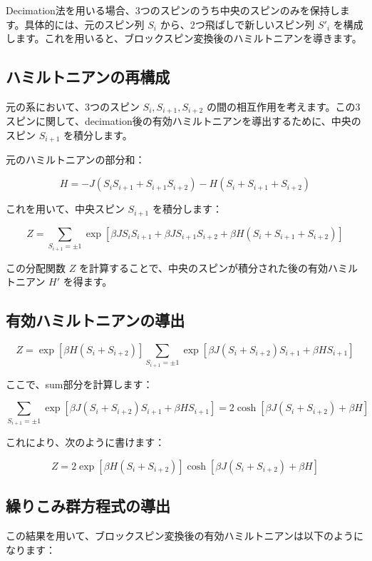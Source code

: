 \documentclass[a4paper,10pt]{ltjsarticle} %
\begin{document}
Decimation法を用いる場合、3つのスピンのうち中央のスピンのみを保持します。具体的には、元のスピン列 \( S_i \) から、2つ飛ばしで新しいスピン列 \( S'_i \) を構成します。これを用いると、ブロックスピン変換後のハミルトニアンを導きます。

\subsection*{ハミルトニアンの再構成}

元の系において、3つのスピン \( S_i, S_{i+1}, S_{i+2} \) の間の相互作用を考えます。この3スピンに関して、decimation後の有効ハミルトニアンを導出するために、中央のスピン \( S_{i+1} \) を積分します。

元のハミルトニアンの部分和：

\[
H = -J (S_i S_{i+1} + S_{i+1} S_{i+2}) - H (S_i + S_{i+1} + S_{i+2})
\]

これを用いて、中央スピン \( S_{i+1} \) を積分します：

\[
Z = \sum_{S_{i+1}=\pm1} \exp\left[ \beta J S_i S_{i+1} + \beta J S_{i+1} S_{i+2} + \beta H (S_i + S_{i+1} + S_{i+2}) \right]
\]

この分配関数 \( Z \) を計算することで、中央のスピンが積分された後の有効ハミルトニアン \( H' \) を得ます。

\subsection*{有効ハミルトニアンの導出}

\[
Z = \exp\left[ \beta H (S_i + S_{i+2}) \right] \sum_{S_{i+1}=\pm1} \exp\left[ \beta J (S_i + S_{i+2}) S_{i+1} + \beta H S_{i+1} \right]
\]

ここで、sum部分を計算します：

\[
\sum_{S_{i+1}=\pm1} \exp\left[ \beta J (S_i + S_{i+2}) S_{i+1} + \beta H S_{i+1} \right] = 2 \cosh\left[ \beta J (S_i + S_{i+2}) + \beta H \right]
\]

これにより、次のように書けます：

\[
Z = 2 \exp\left[ \beta H (S_i + S_{i+2}) \right] \cosh\left[ \beta J (S_i + S_{i+2}) + \beta H \right]
\]

\subsection*{繰りこみ群方程式の導出}

この結果を用いて、ブロックスピン変換後の有効ハミルトニアンは以下のようになります：
\end{document}
